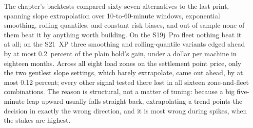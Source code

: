 The chapter's backtests compared sixty-seven alternatives to the last print, spanning slope extrapolation over 10-to-60-minute windows, exponential smoothing, rolling quantiles, and constant risk biases, and out of sample none of them beat it by anything worth building. On the S19j~Pro fleet nothing beat it at all; on the S21~XP three smoothing and rolling-quantile variants edged ahead by at most 0.2~percent of the plain hold's gain, under a dollar per machine in eighteen months. Across all eight load zones on the settlement point price, only the two gentlest slope settings, which barely extrapolate, came out ahead, by at most 0.12 percent; every other signal tested there lost in all sixteen zone-and-fleet combinations. %
The reason is structural, not a matter of tuning: because a big five-minute leap upward usually falls straight back, extrapolating a trend points the decision in exactly the wrong direction, and it is most wrong during spikes, when the stakes are highest.
